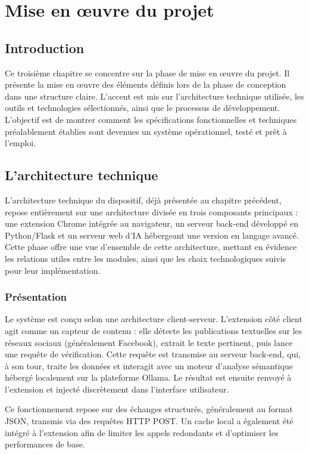 


\chapter{Mise en œuvre du projet}
\section*{Introduction}
Ce troisième chapitre se concentre sur la phase de mise en œuvre du projet. Il présente la mise en œuvre des éléments définis lors de la phase de conception dans une structure claire. L'accent est mis sur l'architecture technique utilisée, les outils et technologies sélectionnés, ainsi que le processus de développement. L'objectif est de montrer comment les spécifications fonctionnelles et techniques préalablement établies sont devenues un système opérationnel, testé et prêt à l'emploi.
\section*{L'architecture technique}
L'architecture technique du dispositif, déjà présentée au chapitre précédent, repose entièrement sur une architecture divisée en trois composants principaux : une extension Chrome intégrée au navigateur, un serveur back-end développé en Python/Flask et un serveur web d'IA hébergeant une version en langage avancé. Cette phase offre une vue d'ensemble de cette architecture, mettant en évidence les relations utiles entre les modules, ainsi que les choix technologiques suivis pour leur implémentation.

\subsection*{Présentation}
Le système est conçu selon une architecture client-serveur. L'extension côté client agit comme un capteur de contenu : elle détecte les publications textuelles sur les réseaux sociaux (généralement Facebook), extrait le texte pertinent, puis lance une requête de vérification. Cette requête est transmise au serveur back-end, qui, à son tour, traite les données et interagit avec un moteur d'analyse sémantique hébergé localement sur la plateforme Ollama. Le résultat est ensuite renvoyé à l'extension et injecté discrètement dans l'interface utilisateur.

Ce fonctionnement repose sur des échanges structurés, généralement au format JSON, transmis via des requêtes HTTP POST. Un cache local a également été intégré à l'extension afin de limiter les appels redondants et d'optimiser les performances de base.

